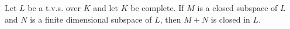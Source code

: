 Let $L$ be a t.v.s. over $K$ and let $K$ be complete. If $M$ is a closed subspace of $L$ and $N$ is a finite dimensional subspace of $L$, then $M + N$ is closed in $L$.
